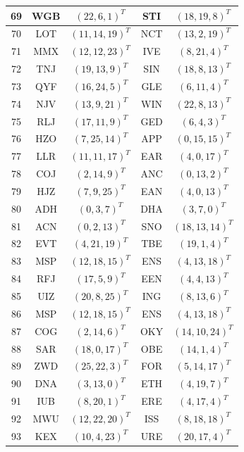 \begin{longtable}{|c|c|c|c|c|}
  \hline
  69 & WGB & $(22, 6, 1)^T$ & STI & $(18, 19, 8)^T$ \\
  \hline
  70 & LOT & $(11, 14, 19)^T$ & NCT & $(13, 2, 19)^T$ \\
  \hline
  71 & MMX & $(12, 12, 23)^T$ & IVE & $(8, 21, 4)^T$ \\
  \hline
  72 & TNJ & $(19, 13, 9)^T$ & SIN & $(18, 8, 13)^T$ \\
  \hline
  73 & QYF & $(16, 24, 5)^T$ & GLE & $(6, 11, 4)^T$ \\
  \hline
  74 & NJV & $(13, 9, 21)^T$ & WIN & $(22, 8, 13)^T$ \\
  \hline
  75 & RLJ & $(17, 11, 9)^T$ & GED & $(6, 4, 3)^T$ \\
  \hline
  76 & HZO & $(7, 25, 14)^T$ & APP & $(0, 15, 15)^T$ \\
  \hline
  77 & LLR & $(11, 11, 17)^T$ & EAR & $(4, 0, 17)^T$ \\
  \hline
  78 & COJ & $(2, 14, 9)^T$ & ANC & $(0, 13, 2)^T$ \\
  \hline
  79 & HJZ & $(7, 9, 25)^T$ & EAN & $(4, 0, 13)^T$ \\
  \hline
  80 & ADH & $(0, 3, 7)^T$ & DHA & $(3, 7, 0)^T$ \\
  \hline
  81 & ACN & $(0, 2, 13)^T$ & SNO & $(18, 13, 14)^T$ \\
  \hline
  82 & EVT & $(4, 21, 19)^T$ & TBE & $(19, 1, 4)^T$ \\
  \hline
  83 & MSP & $(12, 18, 15)^T$ & ENS & $(4, 13, 18)^T$ \\
  \hline
  84 & RFJ & $(17, 5, 9)^T$ & EEN & $(4, 4, 13)^T$ \\
  \hline
  85 & UIZ & $(20, 8, 25)^T$ & ING & $(8, 13, 6)^T$ \\
  \hline
  86 & MSP & $(12, 18, 15)^T$ & ENS & $(4, 13, 18)^T$ \\
  \hline
  87 & COG & $(2, 14, 6)^T$ & OKY & $(14, 10, 24)^T$ \\
  \hline
  88 & SAR & $(18, 0, 17)^T$ & OBE & $(14, 1, 4)^T$ \\
  \hline
  89 & ZWD & $(25, 22, 3)^T$ & FOR & $(5, 14, 17)^T$ \\
  \hline
  90 & DNA & $(3, 13, 0)^T$ & ETH & $(4, 19, 7)^T$ \\
  \hline
  91 & IUB & $(8, 20, 1)^T$ & ERE & $(4, 17, 4)^T$ \\
  \hline
  92 & MWU & $(12, 22, 20)^T$ & ISS & $(8, 18, 18)^T$ \\
  \hline
  93 & KEX & $(10, 4, 23)^T$ & URE & $(20, 17, 4)^T$ \\

\end{longtable}
